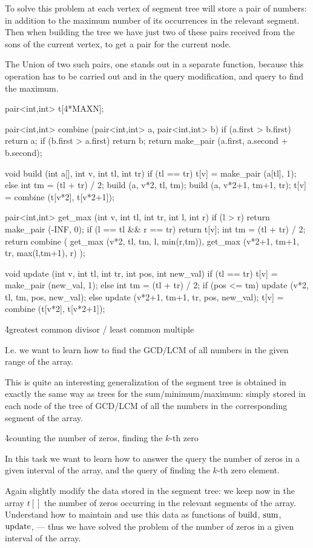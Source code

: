 To solve this problem at each vertex of segment tree will store a pair of numbers: in addition to the maximum number of its occurrences in the relevant segment. Then when building the tree we have just two of these pairs received from the sons of the current vertex, to get a pair for the current node.

The Union of two such pairs, one stands out in a separate function, because this operation has to be carried out and in the query modification, and query to find the maximum.

\code
pair<int,int> t[4*MAXN];

pair<int,int> combine (pair<int,int> a, pair<int,int> b) {
if (a.first > b.first)
return a;
if (b.first > a.first)
return b;
return make_pair (a.first, a.second + b.second);
}

void build (int a[], int v, int tl, int tr) {
if (tl == tr)
t[v] = make_pair (a[tl], 1);
else {
int tm = (tl + tr) / 2;
build (a, v*2, tl, tm);
build (a, v*2+1, tm+1, tr);
t[v] = combine (t[v*2], t[v*2+1]);
}
}

pair<int,int> get_max (int v, int tl, int tr, int l, int r) {
if (l > r)
return make_pair (-INF, 0);
if (l == tl && r == tr)
return t[v];
int tm = (tl + tr) / 2;
return combine (
get_max (v*2, tl, tm, l, min(r,tm)),
get_max (v*2+1, tm+1, tr, max(l,tm+1), r)
);
}

void update (int v, int tl, int tr, int pos, int new_val) {
if (tl == tr)
t[v] = make_pair (new_val, 1);
else {
int tm = (tl + tr) / 2;
if (pos <= tm)
 update (v*2, tl, tm, pos, new_val);
else
update (v*2+1, tm+1, tr, pos, new_val);
t[v] = combine (t[v*2], t[v*2+1]);
}
}
\endcode

\h4{greatest common divisor / least common multiple}

I.e. we want to learn how to find the GCD/LCM of all numbers in the given range of the array.

This is quite an interesting generalization of the segment tree is obtained in exactly the same way as trees for the sum/minimum/maximum: simply stored in each node of the tree of GCD/LCM of all the numbers in the corresponding segment of the array.

\h4{counting the number of zeros, finding the $k$-th zero}

In this task we want to learn how to answer the query the number of zeros in a given interval of the array, and the query of finding the $k$-th zero element.

Again slightly modify the data stored in the segment tree: we keep now in the array $t[]$ the number of zeros occurring in the relevant segments of the array. Understand how to maintain and use this data as functions of $\rm build$, $\rm sum$, $\rm update$, --- thus we have solved the problem of the number of zeros in a given interval of the array.

